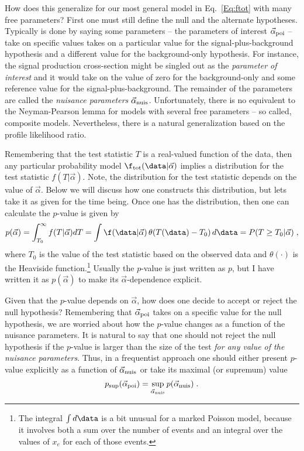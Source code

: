 How does this generalize for our most general model in Eq.~\ref{Eq:ftot} with many free parameters?  First one must still define the null and the alternate hypotheses.  Typically is done by saying some parameters -- the parameters of interest $\vec\alpha_{\rm poi}$ --  take on specific values takes on a particular value for the signal-plus-background hypothesis and a different value for the background-only hypothesis.  For instance, the signal production cross-section might be singled out as the \textit{parameter of interest} and it would take on the value of zero for the background-only and some reference value for the signal-plus-background.  The remainder of the parameters are called the \textit{nuisance parameters} $\vec\alpha_{\rm nuis}$.  Unfortunately, there is no equivalent to the Neyman-Pearson lemma for models with several free parameters -- so called, composite models.  Nevertheless, there is a natural generalization based on the profile likelihood ratio.


Remembering that the test statistic $T$ is a real-valued function of the data, then any particular probability model $\f_{\rm tot}(\data|\vec\alpha)$ implies a distribution for the test statistic $f(T|\vec\alpha)$.  Note, the distribution for the test statistic depends on the value of $\vec\alpha$.  Below we will discuss how one constructs this distribution, but lets take it as given for the time being.  Once one has the distribution, then one can calculate the $p$-value is given by
\begin{equation}
p(\vec\alpha) = \int_{T_0}^\infty f(T | \vec\alpha) dT = \int  \f(\data | \vec\alpha )\, \theta(T(\data) - T_0) \,d\data = P(T\ge T_0 | \vec\alpha) \;,
\end{equation}
where $T_0$ is the value of the test statistic based on the observed data and $\theta( \cdot )$ is the Heaviside function.\footnote{The integral $\int d\data$ is a bit unusual for a marked Poisson model, because it involves both a sum over the number of events and an integral over the values of $x_e$ for each of those events.} Usually the $p$-value is just written as $p$, but I have written it as $p(\vec\alpha)$ to make its  $\vec\alpha$-dependence explicit.  


Given that the $p$-value depends on $\vec\alpha$, how does one decide to accept or reject the null hypothesis?  Remembering that $\vec\alpha_{\rm poi}$ takes on a specific value for the null hypothesis, we are worried about how the $p$-value changes as a function of the nuisance parameters.  It is natural to say that one should not reject the null hypothesis if the $p$-value is larger than the size of the test \textit{for any value of the nuisance parameters}.  Thus, in a frequentist approach one should either present $p$-value explicitly as a function of $\vec{\alpha}_{\rm nuis}$ or take its maximal (or supremum) value 
\begin{equation}
p_{\rm sup}(\vec\alpha_{\rm poi}) = \sup_{ \vec{\alpha}_{\rm nuis}} p(\vec{\alpha}_{\rm nuis}) \; .
\end{equation}


